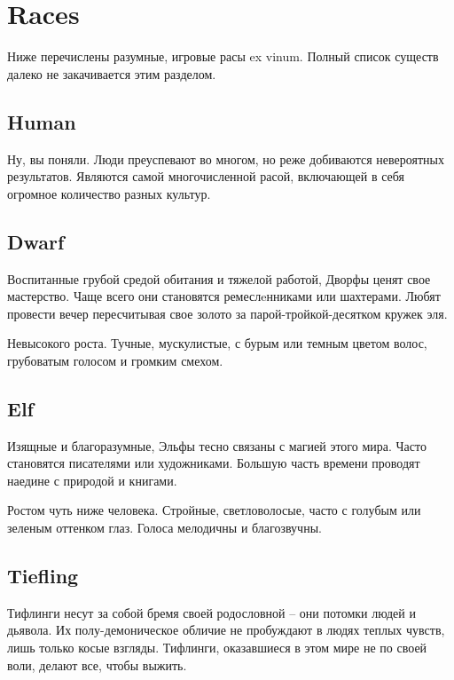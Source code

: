\documentclass[a5paper,11pt]{book}
\begin{document}
\chapter{Races}
\begin{multicols}{2}

\lettrine{Н}{}иже перечислены разумные, игровые расы ex vinum. Полный список существ далеко не закачивается этим разделом.

\section{Human}
Ну, вы поняли. Люди преуспевают во многом, но реже добиваются невероятных результатов. Являются самой многочисленной расой, включающей в себя огромное количество разных культур.

\section{Dwarf}

Воспитанные грубой средой обитания и тяжелой работой, Дворфы ценят свое мастерство. Чаще всего они становятся ремеслeнниками или шахтерами. Любят провести вечер пересчитывая свое золото за парой-тройкой-десятком кружек эля.

Невысокого роста. Тучные, мускулистые, с бурым или темным цветом волос, грубоватым голосом и громким смехом.


\section{Elf}

Изящные и благоразумные, Эльфы тесно связаны с магией этого мира. Часто становятся писателями или художниками. Большую часть времени проводят наедине с природой и книгами.

Ростом чуть ниже человека. Стройные, светловолосые, часто с голубым или зеленым оттенком глаз. Голоса мелодичны и благозвучны.


\section{Tiefling}

Тифлинги несут за собой бремя своей родословной -- они потомки людей и дьявола. Их полу-демоническое обличие не пробуждают в людях теплых чувств, лишь только косые взгляды. Тифлинги, оказавшиеся в этом мире не по своей воли, делают все, чтобы выжить.


\end{multicols}
\end{document}
